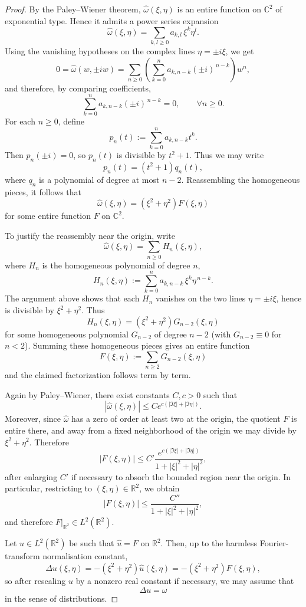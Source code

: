 \documentclass[a4paper,11pt,reqno]{amsart}
\numberwithin{equation}{section}
\theoremstyle{plain} %
\theoremstyle{definition} %
\theoremstyle{remark}
\newcommand{\R}{\mathbb{R}}
\newcommand{\C}{\mathbb{C}}
\begin{document}
\begin{proof}
By the Paley--Wiener theorem, $\widehat{\omega}(\xi,\eta)$ is an entire function on $\C^2$ of exponential type. Hence it admits a power series expansion
\[
\widehat{\omega}(\xi,\eta)=\sum_{k,l\ge 0} a_{k,l}\,\xi^k\eta^l.
\]
Using the vanishing hypotheses on the complex lines $\eta=\pm i\xi$, we get
\[
0=\widehat{\omega}(w,\pm iw)
   =\sum_{n\ge 0}\left(\sum_{k=0}^n a_{k,n-k}(\pm i)^{\,n-k}\right)w^n,
\]
and therefore, by comparing coefficients,
\[
\sum_{k=0}^n a_{k,n-k}(\pm i)^{\,n-k}=0,\qquad \forall n\ge 0.
\]
For each $n\ge 0$, define
\[
p_n(t):=\sum_{k=0}^n a_{k,n-k} t^k.
\]
Then $p_n(\pm i)=0$, so $p_n(t)$ is divisible by $t^2+1$. Thus we may write
\[
p_n(t)=(t^2+1)q_n(t),
\]
where $q_n$ is a polynomial of degree at most $n-2$. Reassembling the homogeneous pieces, it follows that
\[
\widehat{\omega}(\xi,\eta)=(\xi^2+\eta^2)F(\xi,\eta)
\]
for some entire function $F$ on $\C^2$.

To justify the reassembly near the origin, write
\[
\widehat\omega(\xi,\eta)=\sum_{n\ge 0} H_n(\xi,\eta),
\]
where \(H_n\) is the homogeneous polynomial of degree \(n\),
\[
H_n(\xi,\eta):=\sum_{k=0}^n a_{k,n-k}\,\xi^k\eta^{\,n-k}.
\]
The argument above shows that each \(H_n\) vanishes on the two lines
\(\eta=\pm i\xi\), hence is divisible by \(\xi^2+\eta^2\). Thus
\[
H_n(\xi,\eta)=(\xi^2+\eta^2)G_{n-2}(\xi,\eta)
\]
for some homogeneous polynomial \(G_{n-2}\) of degree \(n-2\) (with
\(G_{n-2}\equiv 0\) for \(n<2\)). Summing these homogeneous pieces gives an
entire function
\[
F(\xi,\eta):=\sum_{n\ge 2} G_{n-2}(\xi,\eta)
\]
and the claimed factorization follows term by term.

Again by Paley--Wiener, there exist constants $C,c>0$ such that
\[
|\widehat{\omega}(\xi,\eta)|\le C e^{c(|\Im \xi|+|\Im \eta|)}.
\]
Moreover, since \(\widehat\omega\) has a zero of order at least two at the
origin, the quotient \(F\) is entire there, and away from a fixed neighborhood
of the origin we may divide by \(\xi^2+\eta^2\). Therefore
\[
|F(\xi,\eta)|\le C'\frac{e^{c(|\Im \xi|+|\Im \eta|)}}{1+|\xi|^2+|\eta|^2},
\]
after enlarging \(C'\) if necessary to absorb the bounded region near the
origin. In particular, restricting to $(\xi,\eta)\in \R^2$, we obtain
\[
|F(\xi,\eta)|\le \frac{C''}{1+|\xi|^2+|\eta|^2},
\]
and therefore $F|_{\R^2}\in L^2(\R^2)$.

Let $u\in L^2(\R^2)$ be such that $\widehat{u}=F$ on $\R^2$. Then, up to the harmless Fourier-transform normalisation constant,
\[
\widehat{\Delta u}(\xi,\eta)=-(\xi^2+\eta^2)\widehat{u}(\xi,\eta)
= -(\xi^2+\eta^2)F(\xi,\eta),
\]
so after rescaling $u$ by a nonzero real constant if necessary, we may assume that
\[
\Delta u=\omega
\]
in the sense of distributions.


\end{proof}
\end{document}
